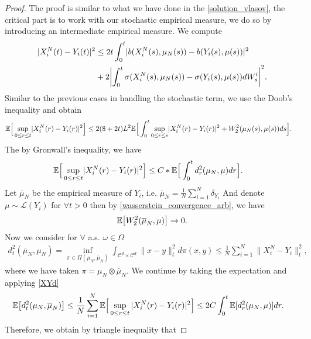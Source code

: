 \begin{proof}
  The proof is similar to what we have done in the \autoref{solution_vlasov}, the critical part is to 
  work with our stochastic empirical measure, we do so by introducing an intermediate empirical measure. We compute 
  \begin{align*}
    \abs{X_i^{N}(t) - Y_i(t) }^2 &\le 2 t \int_0^{t} \abs{b(X^{N}_i(s),\mu_N(s) ) -  b(Y_i(s),\mu(s) )}^2 \\
    &+ 2 \abs*{\int_0^{t} \sigma(X_i^{N}(s),\mu_N(s) ) - \sigma(Y_i(s),\mu(s))  dW_s^{i} }^2
  .\end{align*}
Similar to the previous cases in handling the stochastic term, we use the Doob's inequality and obtain
  \begin{align*}
\mathbb{E}\Big[\sup_{0\le r\le t} \lvert X_i^{N}(r) - Y_i(r) \rvert^2\Big] &\le 2(8+2t) L^2 \mathbb{E}\Big[\int_0^{t}\sup_{0\le r\le s} \lvert X_i^{N}(r) - Y_i(r) \rvert^2+ W_2^{2}(\mu_N(s),\mu(s))   ds\Big].
\end{align*}
The by Gronwall's inequality, we have
\begin{align}\label{XYd}
      \mathbb{E}\Big[\sup_{0\le r\le t} \lvert X_i^{N}(r) - Y_i(r) \rvert^2\Big]                                              &\le  C*\mathbb{E}\Big[\int_0^{t} d_r^2(\mu_N,\mu ) dr\Big]
.\end{align}
  Let $\overline{\mu }_N $ be the empirical measure of $Y_i$, i.e. $
    \overline{\mu }_N = \frac{1}{N} \sum_{i=1}^{N} \delta_{Y_i}  $
 And denote $\mu \sim \mathcal{L}(Y_i)$ for $\forall  t > 0$ then by \autoref{wasserstein_convergence_arb}, we have 
  \begin{align*}
    \mathbb{E}\big[W_2^2(\overline{\mu }_N,\mu  )\big] \to  0
  .\end{align*}
  Now we consider for $\forall $ a.s. $\omega  \in  \Omega $
  \begin{align*}
    d_t^2(\overline{\mu }_N,\mu_N ) = \inf_{\pi  \in  \Pi(\mu_N,\overline{\mu }_N )} \int_{\mathcal{C}^{d} \times  \mathcal{C}^{d}  } \|x-y\|^2_t d\pi(x,y)  \le \frac{1}{N} \sum_{i=1}^{N} \|X^{N}_i - Y_i \|_t^2 
  ,\end{align*}
  where we have taken $\pi  = \mu_N \otimes \overline{\mu }_N $.
  We continue by taking the expectation and applying \autoref{XYd}
  \begin{align*}
    \mathbb{E}\big[d_t^2(\mu_N,\overline{\mu }_N )\big] &\le  \frac{1}{N} \sum_{i=1}^{N} \mathbb{E}\Big[\sup_{0\le r \le t} |X_i^N(r) - Y_i(r) |^2\Big] \le 2C\int_0^{t} \mathbb{E}[d_r^2(\mu_N,\mu )] dr 
  .\end{align*}
Therefore, we obtain by triangle inequality that

\end{proof}
